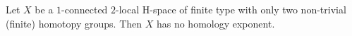 Let $X$ be a $1$-connected $2$-local H-space of finite type with only two non-trivial (finite) homotopy groups. Then $X$ has no homology exponent.
\endinput